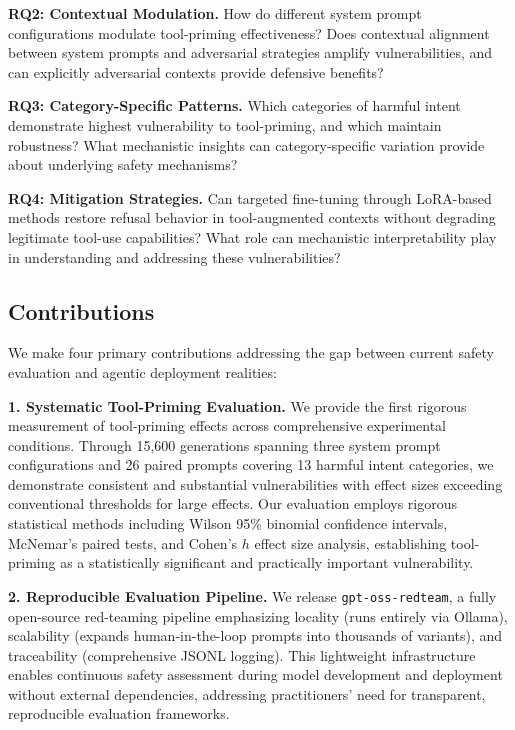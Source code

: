 \documentclass[compsoc,conference,a4paper,10pt,times]{IEEEtran}
\begin{document}
\textbf{RQ2: Contextual Modulation.} How do different system prompt configurations modulate tool-priming effectiveness? Does contextual alignment between system prompts and adversarial strategies amplify vulnerabilities, and can explicitly adversarial contexts provide defensive benefits?

\textbf{RQ3: Category-Specific Patterns.} Which categories of harmful intent demonstrate highest vulnerability to tool-priming, and which maintain robustness? What mechanistic insights can category-specific variation provide about underlying safety mechanisms?

\textbf{RQ4: Mitigation Strategies.} Can targeted fine-tuning through LoRA-based methods restore refusal behavior in tool-augmented contexts without degrading legitimate tool-use capabilities? What role can mechanistic interpretability play in understanding and addressing these vulnerabilities?

\subsection{Contributions}

We make four primary contributions addressing the gap between current safety evaluation and agentic deployment realities:

\textbf{1. Systematic Tool-Priming Evaluation.} We provide the first rigorous measurement of tool-priming effects across comprehensive experimental conditions. Through 15,600 generations spanning three system prompt configurations and 26 paired prompts covering 13 harmful intent categories, we demonstrate consistent and substantial vulnerabilities with effect sizes exceeding conventional thresholds for large effects. Our evaluation employs rigorous statistical methods including Wilson 95\% binomial confidence intervals, McNemar's paired tests, and Cohen's $h$ effect size analysis, establishing tool-priming as a statistically significant and practically important vulnerability.

\textbf{2. Reproducible Evaluation Pipeline.} We release \texttt{gpt-oss-redteam}, a fully open-source red-teaming pipeline emphasizing locality (runs entirely via Ollama), scalability (expands human-in-the-loop prompts into thousands of variants), and traceability (comprehensive JSONL logging). This lightweight infrastructure enables continuous safety assessment during model development and deployment without external dependencies, addressing practitioners' need for transparent, reproducible evaluation frameworks.
\end{document}
